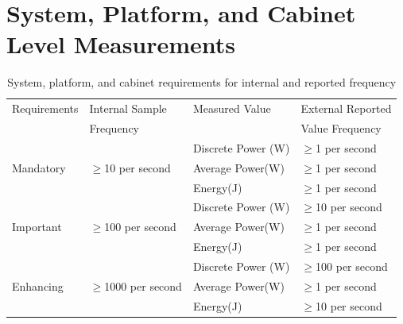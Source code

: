 \section{System, Platform, and Cabinet Level Measurements}

\begin{table}[htbp]
\caption{System, platform, and cabinet requirements for internal and reported frequency}
\label{tab:spclevel}
\centering
\begin{tabular}{ |l|l|l|l| }
\hline
Requirements & Internal Sample & Measured Value & External Reported \\
 & Frequency & & Value Frequency \\
\hline

\multirow{3}{*}{Mandatory} & \multirow{3}{*}{\mbox{$ \ge $}10 per second} &
Discrete Power (W) & \mbox{$ \ge $}1  per second \\ 
 & & Average Power(W) & \mbox{$ \ge $}1 per second \\ 
 & & Energy(J) & \mbox{$ \ge $}1 per second \\  \hline

\multirow{3}{*}{Important} & \multirow{3}{*}{\mbox{$ \ge $}100 per second} &   
Discrete Power (W) & \mbox{$ \ge $}10 per second \\ 
 & & Average Power(W) & \mbox{$ \ge $}1 per second \\ 
 & & Energy(J) & \mbox{$ \ge $}1 per second \\  \hline

\multirow{3}{*}{Enhancing} & \multirow{3}{*}{\mbox{$ \ge $}1000 per second} & 
Discrete Power (W) & \mbox{$ \ge $}100 per second \\ 
 & & Average Power(W) & \mbox{$ \ge $}1 per second \\ 
 & & Energy(J) & \mbox{$ \ge $}10 per second \\  \hline

\end{tabular}
\end{table}



